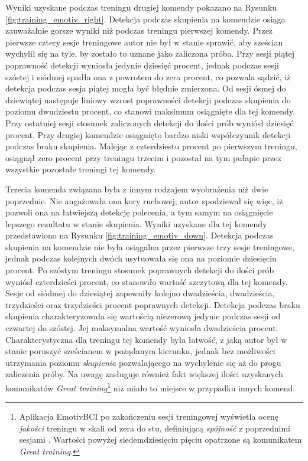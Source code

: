 \documentclass[skorowidz,skroty]{dyplomWEZUT}
\begin{document}
Wyniki uzyskane podczas treningu drugiej komendy pokazano na Rysunku \vref{fig:training_emotiv_right}. Detekcja podczas skupienia na komendzie osiąga zauważalnie gorsze wyniki niż podczas treningu pierwszej komendy. Przez pierwsze cztery sesje treningowe autor nie był w stanie sprawić, aby sześcian wychylił się na tyle, by zostało to uznane jako zaliczona próba. Przy sesji piątej poprawność detekcji wyniosła jedynie dziesięć procent, jednak podczas sesji szóstej i siódmej spadła ona z powrotem do zera procent, co pozwala sądzić, iż detekcja podczas sesja piątej mogła być błędnie zmierzona. Od sesji ósmej do dziewiątej następuje liniowy wzrost poprawności detekcji podczas skupienia do poziomu dwudziestu procent, co stanowi maksimum osiągnięte dla tej komendy. Przy ostatniej sesji stosunek zaliczonych detekcji do ilości prób wyniósł dziesięć procent. Przy drugiej komendzie osiągnięto bardzo niski współczynnik detekcji podczas braku skupienia. Malejąc z czterdziestu procent po pierwszym treningu, osiągnął zero procent przy treningu trzecim i pozostał na tym pułapie przez wszystkie pozostałe treningi tej komendy.

Trzecia komenda związana była z innym rodzajem wyobrażenia niż dwie poprzednie. Nie angażowała ona kory ruchowej; autor spodziewał się więc, iż pozwoli ona na łatwiejszą detekcję polecenia, a tym samym na osiągnięcie lepszego rezultatu w stanie skupienia. Wyniki uzyskane dla tej komendy przedstawiono na Rysunku \vref{fig:training_emotiv_down}. Detekcja podczas skupienia na komendzie nie była osiągalna przez pierwsze trzy sesje treningowe, jednak podczas kolejnych dwóch usytuowała się ona na poziomie dziesięciu procent. Po szóstym treningu stosunek poprawnych detekcji do ilości prób wyniósł czterdzieści procent, co stanowiło wartość szczytową dla tej komendy. Sesje od siódmej do dziesiątej zapewniły kolejno dwadzieścia, dwadzieścia, trzydzieści oraz trzydzieści procent poprawnych detekcji. Detekcja podczas braku skupienia charakteryzowała się wartością niezerową jedynie podczas sesji od czwartej do szóstej. Jej maksymalna wartość wyniosła dwadzieścia procent. Charakterystyczna dla treningu tej komendy była łatwość, z jaką autor był w stanie poruszyć sześcianem w pożądanym kierunku, jednak bez możliwości utrzymania poziomu \textit{skupienia} pozwalającego na wychylenie się aż do progu zaliczenia próby. Na uwagę zasługuje również fakt większej ilości uzyskanych komunikatów \textit{Great training}\footnote{Aplikacja EmotivBCI po zakończeniu sesji treningowej wyświetla ocenę \textit{jakości} treningu w skali od zera do stu, definiującą \textit{spójność} z poprzednimi sesjami \cite{emotivbcidoc}. Wartości powyżej siedemdziesięciu pięciu opatrzone są komunikatem \textit{Great training}.} niż miało to miejsce w przypadku innych komend.
\end{document}
